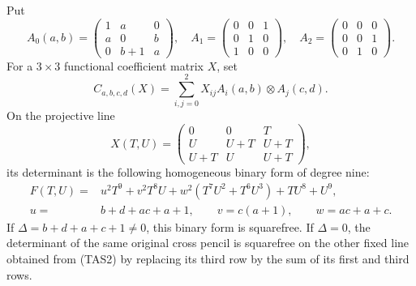 \begin{lemma}
\label{lem:ss-product-two-axis-universal-line}
Put
\[
 A_0(a,b)=\begin{pmatrix}1&a&0\\a&0&b\\0&b+1&a\end{pmatrix},
 \quad A_1=\begin{pmatrix}0&0&1\\0&1&0\\1&0&0\end{pmatrix},
 \quad A_2=\begin{pmatrix}0&0&0\\0&0&1\\0&1&0\end{pmatrix}.
 \tag{TAS1}
\]
For a \(3\times3\) functional coefficient matrix \(X\), set
\[
 C_{a,b,c,d}(X)=\sum_{i,j=0}^2X_{ij}A_i(a,b)\otimes A_j(c,d).
\]
On the projective line
\[
 X(T,U)=\begin{pmatrix}
 0&0&T\\U&U+T&U+T\\U+T&U&U+T
 \end{pmatrix},
 \tag{TAS2}
\]
its determinant is the following homogeneous binary form of degree nine:
\[
 \begin{split}
 F(T,U)={}&u^2T^9+v^2T^8U
              +w^2(T^7U^2+T^6U^3)+TU^8+U^9,\\
 u={}&b+d+ac+a+1,\qquad v=c(a+1),\qquad w=ac+a+c.
 \end{split}
 \tag{TAS3}
\]
If \(\Delta=b+d+a+c+1\ne0\), this binary form is squarefree.
If \(\Delta=0\), the determinant of the same original cross
pencil is squarefree on the other fixed line obtained from (TAS2)
by replacing its third row by the sum of its first and third rows.
\end{lemma}
